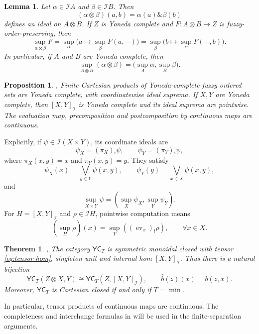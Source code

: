 \documentclass[preprint,3p,times]{elsarticle}
\newtheorem{theorem}{Theorem}[section]
\newtheorem{proposition}[proposition]{Proposition}
\newtheorem{lemma}[lemma]{Lemma}
\theoremstyle{definition}
\theoremstyle{remark}
\newcommand{\I}{\mathcal{I}}
\newcommand{\YC}{\mathsf{YC}}
\newcommand{\supop}{\operatorname{sup}}
\newcommand{\ev}{\operatorname{ev}}
\newcommand{\tn}{\mathbin{\&}}
\numberwithin{equation}{section}
\begin{document}
\begin{lemma}\label{lem:external-ideal-suprema}
Let \(\alpha\in\I A\) and \(\beta\in\I B\). Then
\[
 (\alpha\otimes\beta)(a,b)=\alpha(a)\tn\beta(b)
\]
defines an ideal on \(A\otimes B\). If \(Z\) is Yoneda complete and \(F\colon A\otimes B\to Z\) is fuzzy-order-preserving, then
\begin{equation}\label{eq:iterated-fubini}
 \supop_{\alpha\otimes\beta}F
 =\supop_\alpha\bigl(a\mapsto\supop_\beta F(a,-)\bigr)
 =\supop_\beta\bigl(b\mapsto\supop_\alpha F(-,b)\bigr).
\end{equation}
In particular, if \(A\) and \(B\) are Yoneda complete, then
\begin{equation}\label{eq:sup-coordinatewise}
 \supop_{A\otimes B}(\alpha\otimes\beta)
 =\bigl(\supop_A\alpha,\supop_B\beta\bigr).
\end{equation}
\end{lemma}



\begin{proposition}\cite[Section~5]{LaiLuo2026}, \cite[Theorem~14.1 and Lemma~14.2]{Zhang2024}\label{prop:pointwise-completeness}
Finite Cartesian products of Yoneda-complete fuzzy ordered sets are Yoneda complete, with coordinatewise ideal suprema. If \(X,Y\) are Yoneda complete, then \([X,Y]_{\I}\) is Yoneda complete and its ideal suprema are pointwise. The evaluation map, precomposition and postcomposition by continuous maps are continuous.
\end{proposition}

Explicitly, if \(\psi\in\I(X\times Y)\), its coordinate ideals are
\[
 \psi_X=(\pi_X)_!\psi,\qquad \psi_Y=(\pi_Y)_!\psi,
\]
where \(\pi_X(x,y)=x\) and \(\pi_Y(x,y)=y\). They satisfy
\[
 \psi_X(x)=\bigvee_{y\in Y}\psi(x,y),\qquad
 \psi_Y(y)=\bigvee_{x\in X}\psi(x,y),
\]
and
\[
 \supop_{X\times Y}\psi=(\supop_X\psi_X,\supop_Y\psi_Y).
\]
For \(H=[X,Y]_{\I}\) and \(\rho\in\I H\), pointwise computation means
\[
 (\supop_H\rho)(x)=\supop_Y((\ev_x)_!\rho),
 \qquad \forall x\in X.
\]

\begin{theorem}\cite{LaiZhang2016}, \cite[Theorems~14.1 and~14.5]{Zhang2024}\label{thm:ambient-real}
The category \(\YC_T\) is symmetric monoidal closed with tensor \eqref{eq:tensor-hom}, singleton unit and internal hom \([X,Y]_{\I}\). Thus there is a natural bijection
\[
 \YC_T(Z\otimes X,Y)\cong\YC_T(Z,[X,Y]_{\I}),
 \qquad
 \widehat b(z)(x)=b(z,x).
\]
Moreover, \(\YC_T\) is Cartesian closed if and only if \(T=\min\).
\end{theorem}
In particular, tensor products of continuous maps are continuous. 
The completeness and interchange formulas in  will be used in the finite-separation arguments.
\end{document}
